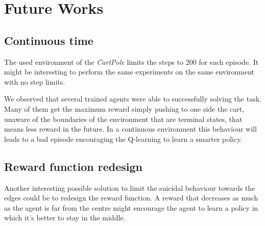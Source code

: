 
\section{Future Works}

\subsection{Continuous time}

The used environment of the \textit{CartPole} limits the steps to 200 for each episode. It might be interesting to perform the same experiments on the same environment with no step limits.

We observed that several trained agents were able to successfully solving the task. Many of them get the maximum reward simply pushing to one side the cart, unaware of the boundaries of the environment that are terminal states, that means less reward in the future. In a continuous environment this behaviour will leads to a bad episode encouraging the Q-learning to learn a smarter policy.

\subsection{Reward function redesign}

Another interesting possible solution to limit the suicidal behaviour towards the edges could be to redesign the reward function. A reward that decreases as much as the agent is far from the centre might encourage the agent to learn a policy in which it's better to stay in the middle.